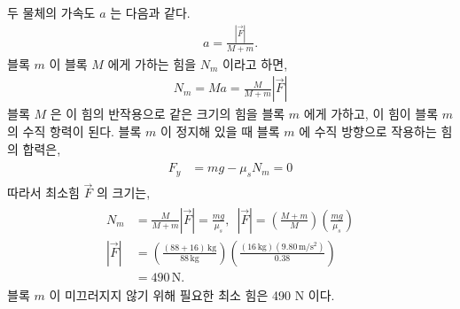 \documentclass[floatfix,nofootinbib,superscriptaddress,fleqn]{revtex4-2}
\begin{document}
두 물체의 가속도 $a$ 는 다음과 같다.
\begin{align}
  a = \frac{|\vec{F}|}{M+m}.
\end{align}
 블록 $m$ 이 블록 $M$ 에게 가하는 힘을 $N_m$ 이라고 하면,
 \begin{align}
   N_m = Ma = \frac{M}{M+m}|\vec{F}|
 \end{align} 
 블록 $M$ 은 이 힘의 반작용으로 같은 크기의 힘을 블록 $m$ 에게 가하고, 
 이 힘이 블록 $m$ 의 수직 항력이 된다. 블록 $m$ 이 정지해 있을 때 
 블록 $m$ 에 수직 방향으로 작용하는 힘의 합력은,
 \begin{align}
  \begin{split}
    F_y &= mg - \mu_s N_m = 0
  \end{split}
 \end{align}
 따라서 최소힘 $\vec{F}$ 의 크기는,
 \begin{align}
   \begin{split}
     N_m &= \frac{M}{M+m}|\vec{F}| =\frac{mg}{\mu_s},\,\,\,
     |\vec{F}| = \left(\frac{M+m}{M}\right)\left(\frac{mg}{\mu_s}\right)  \\
     |\vec{F}| &= \left(\frac{(88+16)\,\mathrm{kg}}{88\,\mathrm{kg}}\right)
     \left(\frac{(16\,\mathrm{kg})(9.80\,\mathrm{m/s^2})}{0.38}\right)  \\
     &= 490\,\mathrm{N}.
   \end{split}
 \end{align}
 블록 $m$ 이 미끄러지지 않기 위해 필요한 최소 힘은 490 N 이다.
\end{document}
